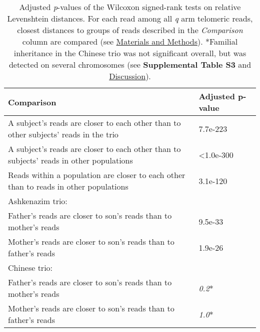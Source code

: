 \begin{samepage} \begin{table}[h!] \small \begin{tabular}{ll}
\hline
\textbf{Comparison}                                                                     & \textbf{Adjusted p-value} \\
\hline
A subject's reads are closer to each other than to other subjects' reads in the trio    & 7.7e-223                  \\
A subject's reads are closer to each other than to subjects' reads in other populations & <1.0e-300                 \\
Reads within a population are closer to each other than to reads in other populations   & 3.1e-120                  \\
Ashkenazim trio:                                                                        & \textbf{}                 \\
\hspace{.5cm} Father's reads are closer to son's reads than to mother's reads           & 9.5e-33                   \\
\hspace{.5cm} Mother's reads are closer to son's reads than to father's reads           & 1.9e-26                   \\
Chinese trio:                                                                           & \textbf{}                 \\
\hspace{.5cm} Father's reads are closer to son's reads than to mother's reads           & \textit{0.2}\mbox{*}      \\
\hspace{.5cm} Mother's reads are closer to son's reads than to father's reads           & \textit{1.0}\mbox{*}      \\
\hline
\end{tabular}
\caption{
    \small Adjusted \textit{p}-values of the Wilcoxon signed-rank tests on relative Levenshtein distances.
    For each read among all \textit{q} arm telomeric reads,
    closest distances to groups of reads described in the \textit{Comparison} column are compared
    (see \hyperref[sec:methods]{Materials and Methods}).
    \mbox{*}Familial inheritance in the Chinese trio was not significant overall,
    but was detected on several chromosomes (see \textbf{Supplemental Table S3} and \hyperref[sec:discussion]{Discussion}).
}
\label{tab:haptests}
\end{table}
\end{samepage}
